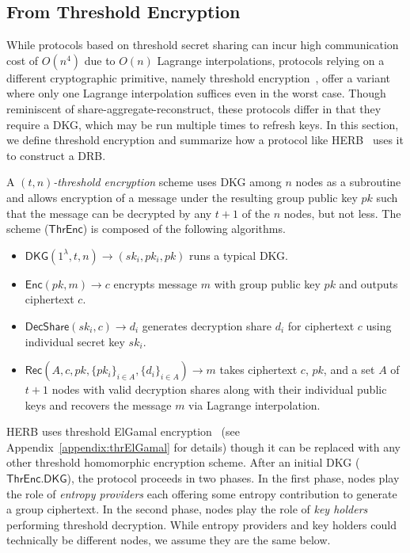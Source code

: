\subsection{From Threshold Encryption}
While protocols based on threshold secret sharing can incur high communication cost of $O(n^4)$ due to $O(n)$ Lagrange interpolations, protocols relying on a different cryptographic primitive, namely threshold encryption~\cite{desmedt1990Threshold}, offer a variant where only one Lagrange interpolation suffices even in the worst case. Though reminiscent of share-aggregate-reconstruct, these protocols differ in that they require a DKG, which may be run multiple times to refresh keys. In this section, we define threshold encryption and summarize how a protocol like HERB~\cite{cherniaeva2019homomorphic} uses it to construct a DRB.

\begin{definition}
A \textit{$(t, n)$-threshold encryption} scheme uses DKG among $n$ nodes as a subroutine and allows encryption of a message under the resulting group public key $pk$ such that the message can be decrypted by any $t + 1$ of the $n$ nodes, but not less. The scheme ($\mathsf{ThrEnc}$) is composed of the following algorithms.
\begin{itemize}
    \item $\mathsf{DKG}(1^\lambda, t, n) \rightarrow (sk_i, pk_i, pk)$ runs a typical DKG.
    \item $\mathsf{Enc}(pk, m) \rightarrow c$ encrypts message $m$ with group public key $pk$ and outputs ciphertext $c$.
    \item $\mathsf{DecShare}(sk_i, c) \rightarrow d_i$ generates decryption share $d_i$ for ciphertext $c$ using individual secret key $sk_i$.
    \item $\mathsf{Rec}(A, c, pk, \{pk_i\}_{i \in A}, \{d_i\}_{i \in A}) \rightarrow m$ takes ciphertext $c$, $pk$, and a set $A$ of $t + 1$ nodes with valid decryption shares along with their individual public keys and recovers the message $m$ via Lagrange interpolation.
\end{itemize}
\end{definition}

HERB uses threshold ElGamal encryption~\cite{desmedt1990Threshold, fouque2001threshold} (see Appendix~\ref{appendix:thrElGamal} for details) though it can be replaced with any other threshold homomorphic encryption scheme. After an initial DKG ($\mathsf{ThrEnc.DKG}$), the protocol proceeds in two phases. In the first phase, nodes play the role of \textit{entropy providers} each offering some entropy contribution to generate a group ciphertext. In the second phase, nodes play the role of \textit{key holders} performing threshold decryption. While entropy providers and key holders could technically be different nodes, we assume they are the same below.

